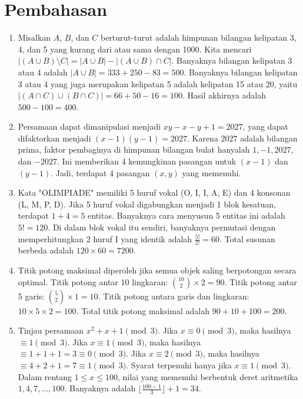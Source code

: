 \documentclass[12pt]{scrartcl}
\begin{document}
\section*{Pembahasan}
\begin{enumerate}

\item Misalkan $A$, $B$, dan $C$ berturut-turut adalah himpunan bilangan kelipatan 3, 4, dan 5 yang kurang dari atau sama dengan 1000. Kita mencari $|(A \cup B) \setminus C| = |A \cup B| - |(A \cup B) \cap C|$. 
Banyaknya bilangan kelipatan 3 atau 4 adalah $|A \cup B| = 333 + 250 - 83 = 500$.
Banyaknya bilangan kelipatan 3 atau 4 yang juga merupakan kelipatan 5 adalah kelipatan 15 atau 20, yaitu $|(A \cap C) \cup (B \cap C)| = 66 + 50 - 16 = 100$. 
Hasil akhirnya adalah $500 - 100 = 400$.

\item Persamaan dapat dimanipulasi menjadi $xy - x - y + 1 = 2027$, yang dapat difaktorkan menjadi $(x-1)(y-1) = 2027$. Karena $2027$ adalah bilangan prima, faktor pembaginya di himpunan bilangan bulat hanyalah $1, -1, 2027$, dan $-2027$. Ini memberikan 4 kemungkinan pasangan untuk $(x-1)$ dan $(y-1)$. Jadi, terdapat 4 pasangan $(x,y)$ yang memenuhi.

\item Kata "OLIMPIADE" memiliki 5 huruf vokal (O, I, I, A, E) dan 4 konsonan (L, M, P, D). Jika 5 huruf vokal digabungkan menjadi 1 blok kesatuan, terdapat $1 + 4 = 5$ entitas. Banyaknya cara menyusun 5 entitas ini adalah $5! = 120$. Di dalam blok vokal itu sendiri, banyaknya permutasi dengan memperhitungkan 2 huruf I yang identik adalah $\frac{5!}{2!} = 60$. Total susunan berbeda adalah $120 \times 60 = 7200$.

\item Titik potong maksimal diperoleh jika semua objek saling berpotongan secara optimal. 
Titik potong antar 10 lingkaran: $\binom{10}{2} \times 2 = 90$. 
Titik potong antar 5 garis: $\binom{5}{2} \times 1 = 10$. 
Titik potong antara garis dan lingkaran: $10 \times 5 \times 2 = 100$. 
Total titik potong maksimal adalah $90 + 10 + 100 = 200$.

\item Tinjau persamaan $x^2 + x + 1 \pmod 3$. 
Jika $x \equiv 0 \pmod 3$, maka hasilnya $\equiv 1 \pmod 3$. 
Jika $x \equiv 1 \pmod 3$, maka hasilnya $\equiv 1+1+1 = 3 \equiv 0 \pmod 3$. 
Jika $x \equiv 2 \pmod 3$, maka hasilnya $\equiv 4+2+1 = 7 \equiv 1 \pmod 3$.
Syarat terpenuhi hanya jika $x \equiv 1 \pmod 3$. Dalam rentang $1 \le x \le 100$, nilai yang memenuhi berbentuk deret aritmetika $1, 4, 7, \dots, 100$. Banyaknya adalah $\lfloor \frac{100-1}{3} \rfloor + 1 = 34$.


\end{enumerate}
\end{document}

